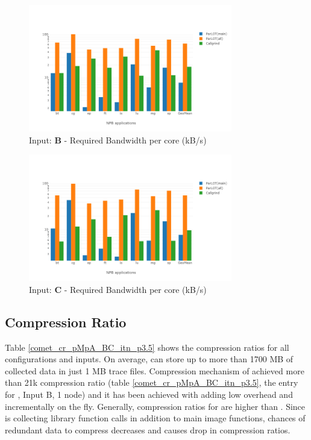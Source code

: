 \begin{figure}[!t]
\centering
\includegraphics[width=3.5in]{figs.comet.newMed/comet_chartAvg_bw_B_p3_5.png}
\caption{ Input: \textbf{B} - Required Bandwidth per core (kB/s)
}
\label{comet_chartAvg_bw_B_p3_5}
\end{figure}



\begin{figure}[!t]
\centering
\includegraphics[width=3.5in]{figs.comet.newMed/comet_chartAvg_bw_C_p3_5.png}
\caption{ Input: \textbf{C}  - Required Bandwidth per core (kB/s)
}
\label{comet_chartAvg_bw_C_p3_5}
\end{figure}


  
\subsection{Compression Ratio}
\label{subsec:cr}

Table \ref{comet_cr_pMpA_BC_itn_p3.5} shows the compression ratios for all configurations and inputs. On average, \parlot can store up to more than 1700 MB of collected data in just 1 MB trace files. Compression mechanism of \parlot achieved more than 21k compression ratio (table \ref{comet_cr_pMpA_BC_itn_p3.5}, the entry for \parlotm, Input B, 1 node) and it has been achieved with adding low overhead and incrementally on the fly.
Generally, compression ratios for \parlotm are higher than \parlota. Since \parlota is collecting library function calls in addition to main image functions, chances of redundant data to compress decreases and causes drop in compression ratios.
  
